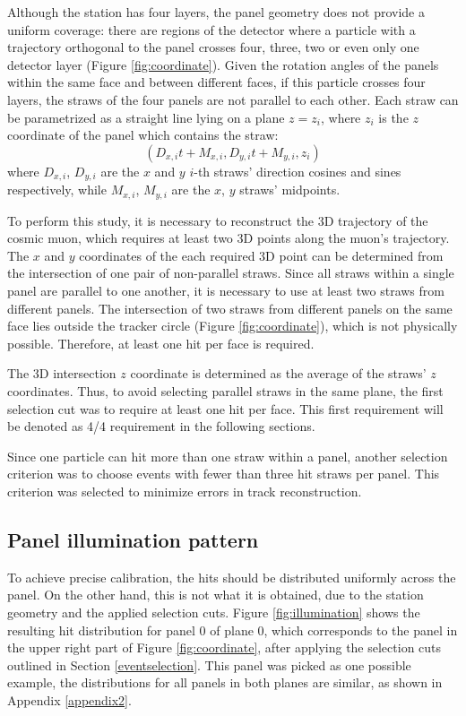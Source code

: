Although the station has four layers, 
the panel geometry does not provide a uniform
coverage: there are regions of the 
detector where a particle with a trajectory orthogonal
to the panel crosses four, three, two or even only one 
detector layer (Figure \ref{fig:coordinate}). Given the
rotation angles of the panels within the same 
face and between different faces, if this particle
crosses four layers, the straws of the four 
panels are not parallel to each other.
Each straw can be parametrized as a straight line 
lying on a plane $z = z_i$, where $z_i$ is the $z$ 
coordinate of the panel which contains the straw:
\begin{equation}\label{equaretta}
    (D_{x,i}t+M_{x,i},D_{y,i}t+M_{y,i},z_i)
\end{equation}
where $D_{x,i}$, $D_{y,i}$ are the $x$ and $y$ 
$i$-th straws' direction cosines and sines respectively, 
while $M_{x,i}$, $M_{y,i}$ are the $x$, $y$ straws' midpoints.

To perform this study, it is necessary to 
reconstruct the 3D trajectory of the cosmic muon, 
which requires at least two 3D points along the muon's 
trajectory. The $x$ and $y$ coordinates of 
the each required 3D point can be determined 
from the intersection of one pair of non-parallel 
straws. Since all straws within a single panel are parallel to 
one another, it is necessary to use at least two straws from 
different panels. The intersection of two straws from 
different panels on the same face lies outside the tracker circle 
(Figure \ref{fig:coordinate}), which is not physically possible. 
Therefore, at least one hit per face is required.

The 3D intersection $z$ 
coordinate is determined as the average of the 
straws' $z$ coordinates. Thus, to avoid selecting 
parallel straws in the same plane, 
the first selection cut 
was to require at least one hit per face. 
This first requirement will be denoted as 
4/4 requirement in the following sections.

Since one particle can hit more than one straw within a panel, 
another selection criterion was to choose events 
with fewer than three hit straws per panel. 
This criterion was selected to minimize errors 
in track reconstruction.
\subsection{Panel illumination pattern}
To achieve precise calibration, the hits should 
be distributed uniformly across the panel.
On the other hand, this is 
not what it is obtained, due to the station geometry
and the applied selection cuts. 
Figure \ref{fig:illumination} shows the 
resulting hit distribution for panel 0 of
plane 0, which corresponds 
to the panel in 
the upper right part of Figure \ref{fig:coordinate}, 
after applying the selection cuts 
outlined in Section 
\ref{eventselection}. 
This panel was picked as one possible 
example, the 
distributions for all panels in 
both planes are similar, as
shown in Appendix \ref{appendix2}.

